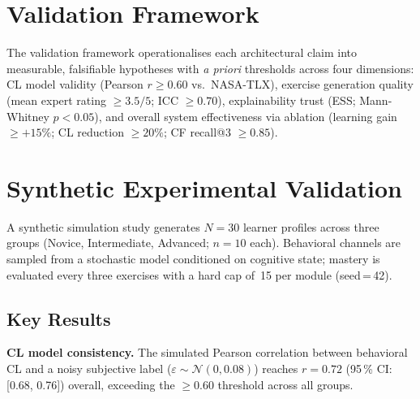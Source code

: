 \documentclass[ASNA,twocolumn]{USG} %
\begin{document}
\section{Validation Framework}
\label{sec:evaluation}

The validation framework operationalises each architectural claim into
measurable, falsifiable hypotheses with \emph{a priori} thresholds
across four dimensions: CL model validity (Pearson $r \geq 0.60$
vs.\ NASA-TLX), exercise generation quality (mean expert rating
$\geq 3.5/5$; ICC $\geq 0.70$), explainability trust (ESS;
Mann-Whitney $p < 0.05$), and overall system effectiveness via
ablation (learning gain $\geq +15\%$; CL reduction $\geq 20\%$;
CF recall@3 $\geq 0.85$).

\section{Synthetic Experimental Validation}
\label{sec:synthetic_validation}

A synthetic simulation study generates $N{=}30$ learner profiles
across three groups (Novice, Intermediate, Advanced; $n{=}10$ each).
Behavioral channels are sampled from a stochastic model conditioned on
cognitive state; mastery is evaluated every three exercises with a
hard cap of~15 per module (seed\,=\,42).

\subsection{Key Results}

\textbf{CL model consistency.} The simulated Pearson correlation
between behavioral CL and a noisy subjective label
($\varepsilon\sim\mathcal{N}(0,0.08)$) reaches $r{=}0.72$
(95\,\% CI: [0.68, 0.76]) overall, exceeding the $\geq 0.60$
threshold across all groups.
\end{document}
